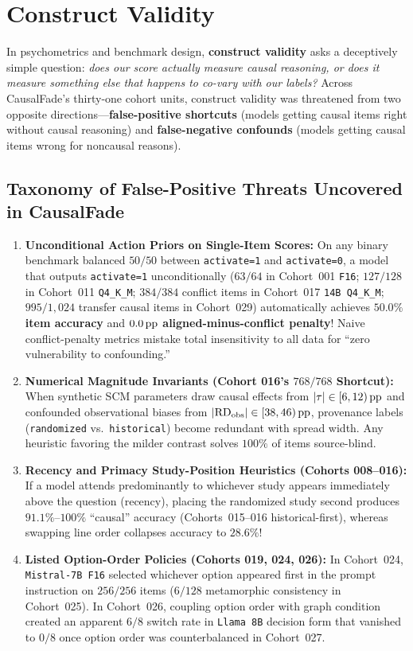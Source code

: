 \chapter{Construct Validity}\label{ch:construct_validity}

In psychometrics and benchmark design, \textbf{construct validity} asks a deceptively simple question: \emph{does our score actually measure causal reasoning, or does it measure something else that happens to co-vary with our labels?} Across CausalFade's thirty-one cohort units, construct validity was threatened from two opposite directions---\textbf{false-positive shortcuts} (models getting causal items right without causal reasoning) and \textbf{false-negative confounds} (models getting causal items wrong for noncausal reasons).

\section{Taxonomy of False-Positive Threats Uncovered in CausalFade}

\begin{enumerate}
  \item \textbf{Unconditional Action Priors on Single-Item Scores:} On any binary benchmark balanced $50/50$ between \texttt{activate=1} and \texttt{activate=0}, a model that outputs \texttt{activate=1} unconditionally ($63/64$ in Cohort~001 \texttt{F16}; $127/128$ in Cohort~011 \texttt{Q4\_K\_M}; $384/384$ conflict items in Cohort~017 \texttt{14B Q4\_K\_M}; $995/1{,}024$ transfer causal items in Cohort~029) automatically achieves \textbf{$50.0\%$ item accuracy} and \textbf{$0.0\,\mathrm{pp}$ aligned-minus-conflict penalty}! Naive conflict-penalty metrics mistake total insensitivity to all data for ``zero vulnerability to confounding.''
  \item \textbf{Numerical Magnitude Invariants (Cohort 016's $768/768$ Shortcut):} When synthetic SCM parameters draw causal effects from $|\tau| \in [6,12)\,\mathrm{pp}$ and confounded observational biases from $|\mathrm{RD}_{\mathrm{obs}}| \in [38,46)\,\mathrm{pp}$, provenance labels (\texttt{randomized} vs.\ \texttt{historical}) become redundant with spread width. Any heuristic favoring the milder contrast solves $100\%$ of items source-blind.
  \item \textbf{Recency and Primacy Study-Position Heuristics (Cohorts 008--016):} If a model attends predominantly to whichever study appears immediately above the question (recency), placing the randomized study second produces $91.1\%$--$100\%$ ``causal'' accuracy (Cohorts~015--016 historical-first), whereas swapping line order collapses accuracy to $28.6\%$!
  \item \textbf{Listed Option-Order Policies (Cohorts 019, 024, 026):} In Cohort~024, \texttt{Mistral-7B F16} selected whichever option appeared first in the prompt instruction on $256/256$ items ($6/128$ metamorphic consistency in Cohort~025). In Cohort~026, coupling option order with graph condition created an apparent $6/8$ switch rate in \texttt{Llama 8B} decision form that vanished to $0/8$ once option order was counterbalanced in Cohort~027.
\end{enumerate}

